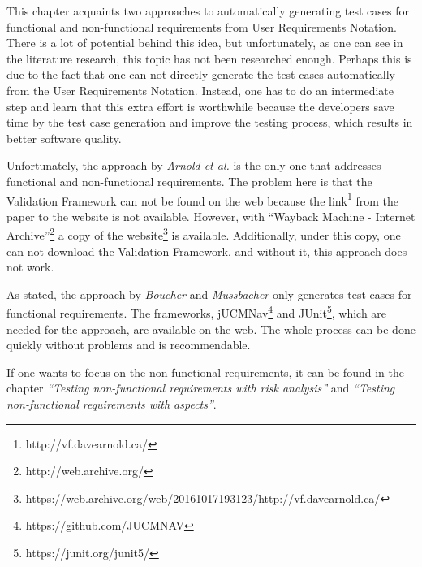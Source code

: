 This chapter acquaints two approaches to automatically generating test cases for functional and non-functional requirements from User Requirements Notation. There is a lot of potential behind this idea, but unfortunately, as one can see in the literature research, this topic has not been researched enough. Perhaps this is due to the fact that one can not directly generate the test cases automatically from the User Requirements Notation. Instead, one has to do an intermediate step and learn that this extra effort is worthwhile because the developers save time by the test case generation and improve the testing process, which results in better software quality. 

Unfortunately, the approach by \textit{Arnold et al.} is the only one that addresses functional and non-functional requirements. The problem here is that the Validation Framework can not be found on the web because the link\footnote{http://vf.davearnold.ca/} from the paper to the website is not available. However, with \enquote{Wayback Machine - Internet Archive}\footnote{http://web.archive.org/} a copy of the website\footnote{https://web.archive.org/web/20161017193123/http://vf.davearnold.ca/} is available. Additionally, under this copy, one can not download the Validation Framework, and without it, this approach does not work.  

As stated, the approach by \textit{Boucher} and \textit{Mussbacher} only generates test cases for functional requirements. The frameworks, jUCMNav\footnote{https://github.com/JUCMNAV} and JUnit\footnote{https://junit.org/junit5/}, which are needed for the approach, are available on the web. The whole process can be done quickly without problems and is recommendable.

If one wants to focus on the non-functional requirements, it can be found in the chapter \textit{\enquote{Testing non-functional requirements with risk analysis}} and \textit{\enquote{Testing non-functional requirements with aspects}}.

